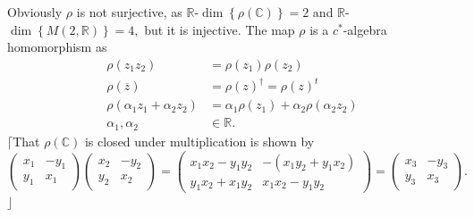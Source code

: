 \documentclass[aps,preprint]{revtex4}
\begin{document}
Obviously $\rho $ is not surjective, as $\mathbb{R}$-$\dim \left\{ \rho
\left( \mathbb{C}\right) \right\} =2$ and $\mathbb{R}$-$\dim \left\{ M\left(
2,\mathbb{R}\right) \right\} =4,$ but it is injective. The map $\rho $ is a $%
c^{\ast }$-algebra homomorphism as 
\begin{align}
\rho \left( z_{1}z_{2}\right) & =\rho \left( z_{1}\right) \rho \left(
z_{2}\right) \\
\rho \left( \overline{z}\right) & =\rho \left( z\right) ^{\dagger }=\rho
\left( z\right) ^{t} \\
\rho \left( \alpha _{1}z_{1}+\alpha _{2}z_{2}\right) & =\alpha _{1}\rho
\left( z_{1}\right) +\alpha _{2}\rho \left( \alpha _{2}z_{2}\right) \\
\alpha _{1},\alpha _{2}& \in \mathbb{R}.
\end{align}%
$\lceil $That $\rho \left( \mathbb{C}\right) $ is closed under
multiplication is shown by%
\begin{equation}
\left( 
\begin{array}{cc}
x_{1} & -y_{1} \\ 
y_{1} & x_{1}%
\end{array}%
\right) \left( 
\begin{array}{cc}
x_{2} & -y_{2} \\ 
y_{2} & x_{2}%
\end{array}%
\right) =\left( 
\begin{array}{cc}
x_{1}x_{2}-y_{1}y_{2} & -\left( x_{1}y_{2}+y_{1}x_{2}\right) \\ 
y_{1}x_{2}+x_{1}y_{2} & x_{1}x_{2}-y_{1}y_{2}%
\end{array}%
\right) =\left( 
\begin{array}{cc}
x_{3} & -y_{3} \\ 
y_{3} & x_{3}%
\end{array}%
\right) .
\end{equation}%
$\rfloor $
\end{document}
